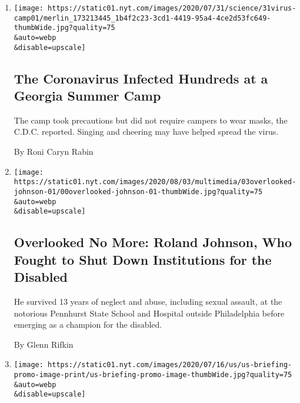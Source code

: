 \begin{enumerate}
\def\labelenumi{\arabic{enumi}.}
\item
  \href{/2020/07/31/health/coronavirus-children-camp.html}{}

  \texttt{[image: https://static01.nyt.com/images/2020/07/31/science/31virus-camp01/merlin\_173213445\_1b4f2c23-3cd1-4419-95a4-4ce2d53fc649-thumbWide.jpg?quality=75\\\&auto=webp\\\&disable=upscale]}

  \hypertarget{the-coronavirus-infected-hundreds-at-a-georgia-summer-camp}{%
  \subsection{The Coronavirus Infected Hundreds at a Georgia Summer
  Camp}\label{the-coronavirus-infected-hundreds-at-a-georgia-summer-camp}}

  The camp took precautions but did not require campers to wear masks,
  the C.D.C. reported. Singing and cheering may have helped spread the
  virus.

  By Roni Caryn Rabin
\item
  \href{/2020/07/31/obituaries/roland-johnson-overlooked.html}{}

  \texttt{[image: https://static01.nyt.com/images/2020/08/03/multimedia/03overlooked-johnson-01/00overlooked-johnson-01-thumbWide.jpg?quality=75\\\&auto=webp\\\&disable=upscale]}

  \hypertarget{overlooked-no-more-roland-johnson-who-fought-to-shut-down-institutions-for-the-disabled}{%
  \subsection{Overlooked No More: Roland Johnson, Who Fought to Shut
  Down Institutions for the
  Disabled}\label{overlooked-no-more-roland-johnson-who-fought-to-shut-down-institutions-for-the-disabled}}

  He survived 13 years of neglect and abuse, including sexual assault,
  at the notorious Pennhurst State School and Hospital outside
  Philadelphia before emerging as a champion for the disabled.

  By Glenn Rifkin
\item
  \href{/2020/07/31/world/coronavirus-covid-19.html}{}

  \texttt{[image: https://static01.nyt.com/images/2020/07/16/us/us-briefing-promo-image-print/us-briefing-promo-image-thumbWide.jpg?quality=75\\\&auto=webp\\\&disable=upscale]}


\end{enumerate}
